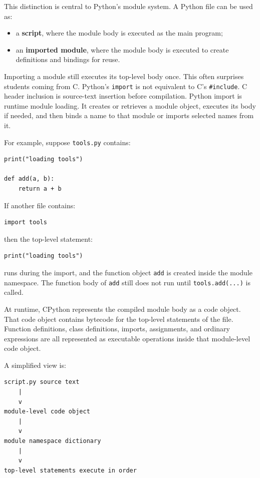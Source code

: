This distinction is central to Python's module system. A Python file can be used as:

\begin{itemize}
    \item a \textbf{script}, where the module body is executed as the main program;
    \item an \textbf{imported module}, where the module body is executed to create definitions and bindings for reuse.
\end{itemize}

Importing a module still executes its top-level body once. This often surprises students coming from C. Python's \texttt{import} is not equivalent to C's \texttt{\#include}. C header inclusion is source-text insertion before compilation. Python import is runtime module loading. It creates or retrieves a module object, executes its body if needed, and then binds a name to that module or imports selected names from it.

For example, suppose \texttt{tools.py} contains:

\begin{verbatim}
print("loading tools")

def add(a, b):
    return a + b
\end{verbatim}

If another file contains:

\begin{verbatim}
import tools
\end{verbatim}

then the top-level statement:

\begin{verbatim}
print("loading tools")
\end{verbatim}

runs during the import, and the function object \texttt{add} is created inside the module namespace. The function body of \texttt{add} still does not run until \texttt{tools.add(...)} is called.

At runtime, CPython represents the compiled module body as a code object. That code object contains bytecode for the top-level statements of the file. Function definitions, class definitions, imports, assignments, and ordinary expressions are all represented as executable operations inside that module-level code object.

A simplified view is:

\begin{verbatim}
script.py source text
    |
    v
module-level code object
    |
    v
module namespace dictionary
    |
    v
top-level statements execute in order
\end{verbatim}

